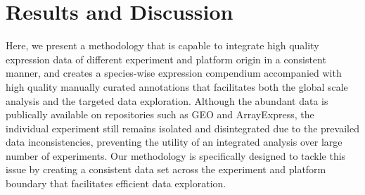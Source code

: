 








\section{Results and Discussion}


Here, we present a methodology that is capable to integrate high quality
expression data of different experiment and platform origin in a consistent
manner, and creates a species-wise expression compendium accompanied with
high quality manually curated annotations that facilitates both the global
scale analysis and the targeted data exploration.
%
Although the abundant data is publically available on repositories such as
GEO and ArrayExpress, the individual experiment still remains isolated and
disintegrated due to the prevailed data inconsistencies, preventing the
utility of an integrated analysis over large number of experiments.
%
Our methodology is specifically designed to tackle this issue by creating a
consistent data set across the experiment and platform boundary that
facilitates efficient data exploration.


